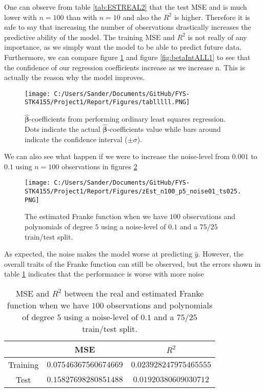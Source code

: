 \documentclass[12pt,a4paper]{article}
\begin{document}
\noindent One can observe from table \ref{tab:ESTREAL2} that the test MSE and is much lower with $n = 100$ than with $n = 10$ and also the $R^2$ is higher. Therefore it is safe to say that increasing the number of observations drastically increases the predictive ability of the model. The training MSE and $R^2$ is not really of any importance, as we simply want the model to be able to predict future data. 
\\
Furthermore, we can compare figure \ref{fig:betaIntALL2} and figure \ref{fig:betaIntALL1} to see that the confidence of our regression coefficients increase as we increase n. This is actually the reason why the model improves.

\begin{figure}[H]
\centering
\texttt{[image: C:/Users/Sander/Documents/GitHub/FYS-STK4155/Project1/Report/Figures/tablllll.PNG]}
\caption{\label{fig:betaIntALL2} $\hat{\boldsymbol{\beta}}$-coefficients from performing ordinary least squares regression. Dots indicate the actual $\hat{\boldsymbol{\beta}}$-coefficients value while bars around indicate the confidence interval ($\pm \sigma$).}
\end{figure}

\noindent We can also see what happen if we were to increase the noise-level from $0.001$ to $0.1$ using $n = 100$ observations in figures \ref{fig:FrankeEst3}

\begin{figure}[h]
\centering
\texttt{[image: C:/Users/Sander/Documents/GitHub/FYS-STK4155/Project1/Report/Figures/zEst\_n100\_p5\_noise01\_ts025.PNG]}
\caption{\label{fig:FrankeEst3} The estimated Franke function when we have $100$ observations and polynomials of degree $5$ using a noise-level of $0.1$ and a $75/25$ train/test split.}
\end{figure}

\noindent As expected, the noise makes the model worse at predicting $\hat{y}$. However, the overall traits of the Franke function can still be observed, but the errors shown in table \ref{tab:ESTREAL3} indicates that the performance is worse with more noise

\begin{table}[H]
\caption{\label{tab:ESTREAL3} MSE and $R^2$ between the real and estimated Franke function when we have $100$ observations and polynomials of degree $5$ using a noise-level of $0.1$ and a $75/25$ train/test split.}
\centering
\begin{tabular}{c|c|c}
 & MSE & $R^2$\\
\hline
Training & $0.07546367560674669$ & $0.023928247975465555$\\
\hline
Test & $0.15827698280851488$ & $0.01920380609030712$\\	  
\end{tabular}
\end{table}
\end{document}
